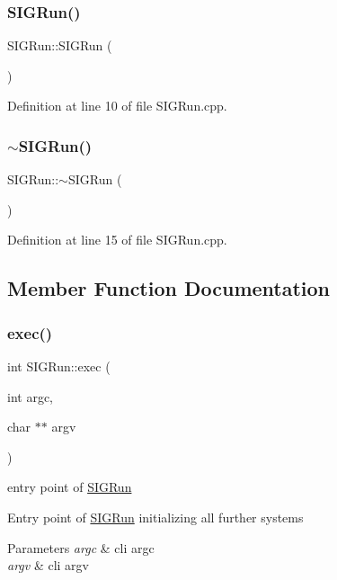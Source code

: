 \subsubsection{\texorpdfstring{SIGRun()}{SIGRun()}}
{\footnotesize\ttfamily S\+I\+G\+Run\+::\+S\+I\+G\+Run (\begin{DoxyParamCaption}{ }\end{DoxyParamCaption})}



Definition at line 10 of file S\+I\+G\+Run.\+cpp.

\mbox{\label{class_s_i_g_run_addf9aae6daca50376eeed2b1c73e5a07}} 
\subsubsection{\texorpdfstring{$\sim$SIGRun()}{~SIGRun()}}
{\footnotesize\ttfamily S\+I\+G\+Run\+::$\sim$\+S\+I\+G\+Run (\begin{DoxyParamCaption}{ }\end{DoxyParamCaption})}



Definition at line 15 of file S\+I\+G\+Run.\+cpp.



\subsection{Member Function Documentation}
\mbox{\label{class_s_i_g_run_a26887ac64836e80c0b7eaaaeff0f6d14}} 
\subsubsection{\texorpdfstring{exec()}{exec()}}
{\footnotesize\ttfamily int S\+I\+G\+Run\+::exec (\begin{DoxyParamCaption}\item[{int}]{argc,  }\item[{char $\ast$$\ast$}]{argv }\end{DoxyParamCaption})}



entry point of \mbox{\hyperlink{class_s_i_g_run}{S\+I\+G\+Run}} 

Entry point of \mbox{\hyperlink{class_s_i_g_run}{S\+I\+G\+Run}} initializing all further systems 
\begin{DoxyParams}{Parameters}
{\em argc} & cli argc \\
\hline
{\em argv} & cli argv \\
\hline
\end{DoxyParams}


